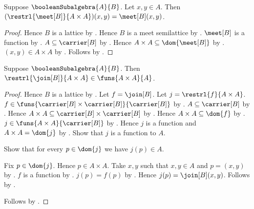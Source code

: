 \begin{proposition}\label{boolean_subalgebra_meet_restriction_apply}
    Suppose $\booleanSubalgebra{A}{B}$.
    Let $x,y\in A$.
    Then $(\restrl{\meet[B]}{A\times A})(x,y)=\meet[B](x,y)$.
\end{proposition}
\begin{proof}
    Hence $B$ is a lattice by .
    Hence $B$ is a meet semilattice by
        .
    $\meet[B]$ is a function by .
    $A\subseteq\carrier[B]$ by .
    Hence $A\times A\subseteq\dom{\meet[B]}$ by
        .
    $(x,y)\in A\times A$ by .
    Follows by .
\end{proof}

\begin{proposition}\label{boolean_subalgebra_join_restriction_type}
    Suppose $\booleanSubalgebra{A}{B}$.
    Then $\restrl{\join[B]}{A\times A}\in\funs{A\times A}{A}$.
\end{proposition}
\begin{proof}
    Hence $B$ is a lattice by .
    Let $f=\join[B]$.
    Let $j=\restrl{f}{A\times A}$.
    $f\in\funs{\carrier[B]\times\carrier[B]}{\carrier[B]}$ by
        .
    $A\subseteq\carrier[B]$ by .
    Hence $A\times A\subseteq\carrier[B]\times\carrier[B]$ by
        .
    Hence $A\times A\subseteq\dom{f}$ by .
    $j\in\funs{A\times A}{\carrier[B]}$ by .
    Hence $j$ is a function and $A\times A=\dom{j}$ by
        .
    Show that $j$ is a function to $A$.
    \begin{subproof}
        Show that for every $p\in\dom{j}$ we have $j(p)\in A$.
        \begin{subproof}
            Fix $p\in\dom{j}$.
            Hence $p\in A\times A$.
            Take $x,y$ such that $x,y\in A$ and $p=(x,y)$ by
                .
            $f$ is a function by .
            $j(p)=f(p)$ by .
            Hence $j(p)=\join[B](x,y)$.
            Follows by .
        \end{subproof}
    \end{subproof}
    Follows by .
\end{proof}

